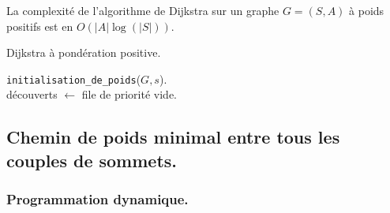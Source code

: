 \documentclass[french, 11pt]{article}
\begin{document}
\begin{thm}{}{}
    La complexité de l'algorithme de Dijkstra sur un graphe $G=(S,A)$ à poids positifs est en $O(|A|\log(|S|))$.
\end{thm}

\begin{defi}{Dijkstra à pondération positive.}{}
    \begin{algorithm}[H]
        \caption{Algorithme de Dijkstra}
        \texttt{initialisation\_de\_poids}($G,s$).\\
        découverts $\gets$ file de priorité vide.\\
    \end{algorithm}
\end{defi}

\subsection{Chemin de poids minimal entre tous les couples de sommets.}

\subsubsection{Programmation dynamique.}
\end{document}

